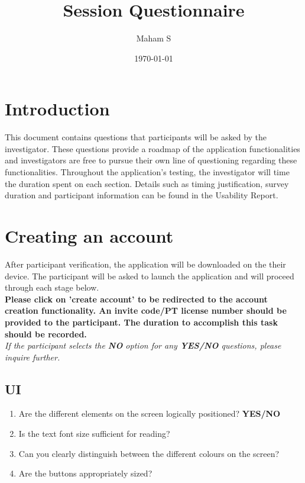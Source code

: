 \documentclass{article}
\title{Session Questionnaire}
\author{Maham S}
\date{\today}
\begin{document}
\maketitle
\newpage
\tableofcontents
\newpage

\section{Introduction}
This document contains questions that participants will be asked by the investigator. These questions provide
a roadmap of the application functionalities and investigators are free to pursue their own line of questioning
regarding these functionalities. Throughout the application's testing, the investigator will time 
the duration spent on each section.  Details such as timing justification, survey duration and participant information 
can be found in the Usability Report. %


\section{Creating an account} 

After participant verification, the application will be downloaded on the their device. The participant 
will be asked to launch the application and will proceed through each stage below. \\

\noindent \textbf{Please click on 'create account' to be redirected to the account creation functionality. An invite code/PT license 
number should be provided to the participant. The duration to accomplish this task should be recorded.}\\ 
\textit{If the participant selects the \textbf{NO} option for any \textbf{YES/NO} questions, please inquire further.} 

\subsection{UI}
\begin{enumerate}
    \item Are the different elements on the screen logically positioned? \textbf{YES/NO} 
    \item Is the text font size sufficient for reading?
    \item Can you clearly distinguish between the different colours on the screen?
    \item Are the buttons appropriately sized?
\end{enumerate}
\end{document}
